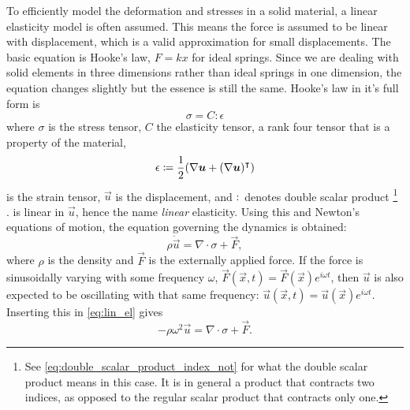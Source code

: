 To efficiently model the deformation and stresses in a solid material,
a linear elasticity model is often assumed.
This means the force is assumed to be linear with displacement, which is a valid
approximation for small displacements.
The basic equation is Hooke's law, $F = kx$ for ideal springs.
Since we are dealing with solid elements in three dimensions rather than ideal
springs in one dimension, the equation changes slightly but the essence is still
the same.
Hooke's law in it's full form is
\begin{equation}\label{eq:stress}
	\sigma = C : \epsilon
\end{equation}
where $\sigma$ is the stress tensor, $C$ the elasticity tensor, a
rank four tensor that is a property of the material,
\begin{equation}\label{eq:strain}
	\epsilon \coloneqq \frac12(\nabla \bm u + (\nabla \bm u)^\intercal)
\end{equation}
is the strain tensor, $\vec{u}$ is the displacement,
and $:$ denotes double scalar product%
\footnote{%
	See \cref{eq:double_scalar_product_index_not} for what the double scalar
	product means in this case. It is in general a product that contracts two
	indices, as opposed to the regular scalar product that contracts only one.
}%
.
 is linear in $\vec u$, hence the name \emph{linear} elasticity.
Using this and Newton's equations of motion, the equation governing the dynamics
is obtained:
\begin{equation}\label{eq:lin_el}
	\rho \ddot{\vec{u}} = \nabla \cdot \sigma + \vec F,
\end{equation}
where $\rho$ is the density and $\vec F$ is the
externally applied force.
If the force is sinusoidally varying with some frequency $\omega$,
$\vec F(\vec x, t) = \vec F(\vec x) e^{i\omega t}$,
then $\vec u$ is also expected to be oscillating with that same frequency:
$\vec u(\vec x, t) = \vec u(\vec x) e^{i \omega t}$.
Inserting this in \cref{eq:lin_el} gives
\begin{equation}\label{eq:lin_el2}
	-\rho \omega^2 \vec{u} = \nabla \cdot \sigma + \vec F.
\end{equation}

